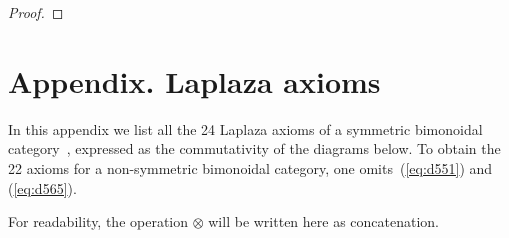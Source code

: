 \documentclass[10pt]{simplearticle}
\begin{document}
\begin{proof}
\end{proof}

\appendix
\section*{Appendix. Laplaza axioms}

\renewcommand{\theequation}{A.\arabic{equation}}
\setcounter{equation}{0}

In this appendix we list all the 24 Laplaza axioms of a symmetric
bimonoidal category~\cite[Definition~2.1.2]{JY_bimon24}, expressed
as the commutativity of the diagrams below. To obtain the 22 axioms
for a non-symmetric bimonoidal category, one omits~(\ref{eq:d551})
and (\ref{eq:d565}).

For readability, the operation $\otimes$ will be written here as
concatenation.
\end{document}
